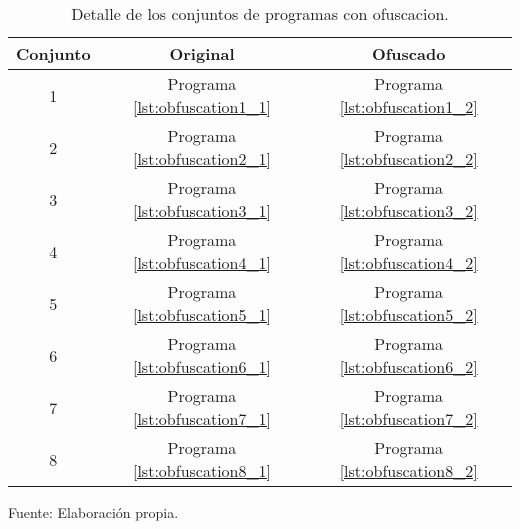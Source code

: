 \begin{table}[H]
\centering
\begin{tabular}{|c||c||c|}
\hline
Conjunto & Original & Ofuscado \\ \hline
1 & Programa \ref{lst:obfuscation1_1} & Programa \ref{lst:obfuscation1_2} \\ \hline
2 & Programa \ref{lst:obfuscation2_1} & Programa \ref{lst:obfuscation2_2} \\ \hline
3 & Programa \ref{lst:obfuscation3_1} & Programa \ref{lst:obfuscation3_2} \\ \hline
4 & Programa \ref{lst:obfuscation4_1} & Programa \ref{lst:obfuscation4_2} \\ \hline
5 & Programa \ref{lst:obfuscation5_1} & Programa \ref{lst:obfuscation5_2} \\ \hline
6 & Programa \ref{lst:obfuscation6_1} & Programa \ref{lst:obfuscation6_2} \\ \hline
7 & Programa \ref{lst:obfuscation7_1} & Programa \ref{lst:obfuscation7_2} \\ \hline
8 & Programa \ref{lst:obfuscation8_1} & Programa \ref{lst:obfuscation8_2} \\ \hline
\end{tabular}
\caption{Detalle de los conjuntos de programas con ofuscacion.}
Fuente: Elaboración propia.
\label{firstTest}
\end{table}
